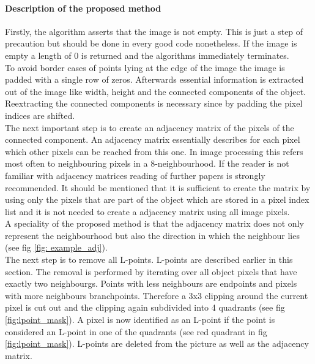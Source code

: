 \documentclass{article}
\begin{document}
\paragraph{Description of the proposed method}
Firstly, the algorithm asserts that the image is not empty. This is just a step of precaution but should be done in every good code nonetheless. If the image is empty a length of 0 is returned and the algorithms immediately terminates.\\
To avoid border cases of points lying at the edge of the image the image is padded with a single row of zeros. Afterwards essential information is extracted out of the image like width, height and the connected components of the object. Reextracting the connected components is necessary since by padding the pixel indices are shifted.\\
The next important step is to create an adjacency matrix of the pixels of the connected component. An adjacency matrix essentially describes for each pixel which other pixels can be reached from this one. In image processing this refers most often to neighbouring pixels in a 8-neighbourhood. If the reader is not familiar with adjacency matrices reading of further papers is strongly recommended. It should be mentioned that it is sufficient to create the matrix by using only the pixels that are part of the object which are stored in a pixel index list and it is not needed to create a adjacency matrix using all image pixels. \\
A speciality of the proposed method is that the adjacency matrix does not only represent the neighbourhood but also the direction in which the neighbour lies (see fig \ref{fig: example_adj}).\\
The next step is to remove all L-points. L-points are described earlier in this section. The removal is performed by iterating over all object pixels that have exactly two neighbourgs. Points with less neighbours are endpoints and pixels with more neighbours branchpoints. Therefore a 3x3 clipping around the current pixel is cut out and the clipping again subdivided into 4 quadrants (see fig \ref{fig:lpoint_mask}). A pixel is now identified as an L-point if the point is considered an L-point in one of the quadrants (see red quadrant in fig \ref{fig:lpoint_mask}). L-points are deleted from the picture as well as the adjacency matrix.\\
\end{document}
